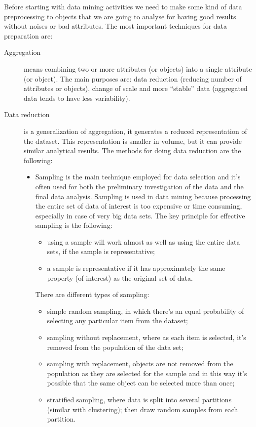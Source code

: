 Before starting with data mining activities we need to make some kind of data preprocessing to objects that we are going to analyse for having good results without noises or bad attributes.
The most important techniques for data preparation are:
\begin{description}
	\item[Aggregation] means combining two or more attributes (or objects) into a single attribute (or object).
	The main purposes are: data reduction (reducing number of attributes or objects), change of scale and more ``stable'' data (aggregated data tends to have less variability).
	\item[Data reduction] is a generalization of aggregation, it generates a reduced representation of the dataset.
	This representation is smaller in volume, but it can provide similar analytical results.
	The methods for doing data reduction are the following:
	\begin{itemize}
		\item Sampling is the main technique employed for data selection and it's often used for both the preliminary investigation of the data and the final data analysis.
		Sampling is used in data mining because processing the entire set of data of interest is too expensive or time consuming, especially in case of very big data sets.
		The key principle for effective sampling is the following:
		\begin{itemize}
			\item using a sample will work almost as well as using the entire data sets, if the sample is representative;
			\item a sample is representative if it has approximately the same property (of interest) as the original set of data.
		\end{itemize}
		There are different types of sampling:
		\begin{itemize}
			\item simple random sampling, in which there's an equal probability of selecting any particular item from the dataset;
			\item sampling without replacement, where as each item is selected, it's removed from the population of the data set;
			\item sampling with replacement, objects are not removed from the population as they are selected for the sample and in this way it's possible that the same object can be selected more than once;
			\item stratified sampling, where data is split into several partitions (similar with clustering); then draw random samples from each partition.

\end{itemize}
\end{itemize}
\end{description}
